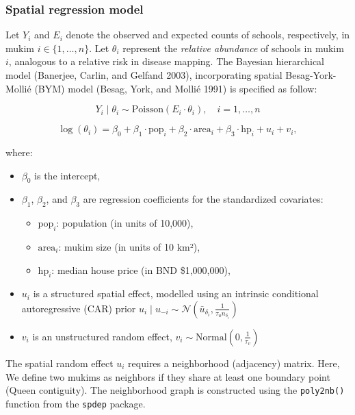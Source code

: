 \documentclass[
  12pt,
]{article}
\providecommand{\tightlist}{%
  \setlength{\itemsep}{0pt}\setlength{\parskip}{0pt}}
\begin{document}
\subsubsection{Spatial regression model}\label{spatial-regression-model}

Let \(Y_i\) and \(E_i\) denote the observed and expected counts of
schools, respectively, in mukim \(i \in \{1, \dotsc, n\}\). Let
\(\theta_i\) represent the \emph{relative abundance} of schools in mukim
\(i\), analogous to a relative risk in disease mapping. The Bayesian
hierarchical model (Banerjee, Carlin, and Gelfand 2003), incorporating
spatial Besag-York-Mollié (BYM) model (Besag, York, and Mollié 1991) is
specified as follow:

\[
Y_i \mid \theta_i \sim \text{Poisson}(E_i \cdot \theta_i), \quad i = 1, \dotsc, n
\]

\[
\log(\theta_i) = \beta_0 + \beta_1 \cdot \text{pop}_i + \beta_2 \cdot \text{area}_i + \beta_3 \cdot \text{hp}_i + u_i + v_i,
\]

where:

\begin{itemize}
\tightlist
\item
  \(\beta_0\) is the intercept,
\item
  \(\beta_1\), \(\beta_2\), and \(\beta_3\) are regression coefficients
  for the standardized covariates:

  \begin{itemize}
  \tightlist
  \item
    \(\text{pop}_i\): population (in units of 10,000),
  \item
    \(\text{area}_i\): mukim size (in units of 10 km²),
  \item
    \(\text{hp}_i\): median house price (in BND \$1,000,000),
  \end{itemize}
\item
  \(u_i\) is a structured spatial effect, modelled using an intrinsic
  conditional autoregressive (CAR) prior
  \(u_i \mid u_{-i} \sim \mathcal{N}(\bar{u}_{\delta_i}, \frac{1}{\tau_u n_{\delta_i}})\)
\item
  \(v_i\) is an unstructured random effect,
  \(v_i \sim \text{Normal}(0, \frac{1}{\tau_v})\)
\end{itemize}

The spatial random effect \(u_i\) requires a neighborhood (adjacency)
matrix. Here, We define two mukims as neighbors if they share at least
one boundary point (Queen contiguity). The neighborhood graph is
constructed using the \texttt{poly2nb()} function from the
\texttt{spdep} package.
\end{document}
